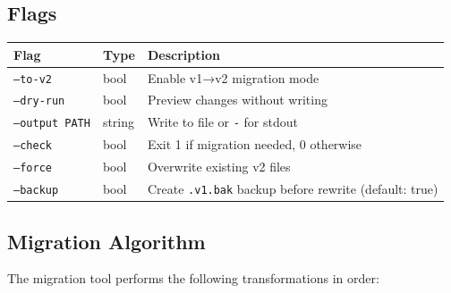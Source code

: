 \subsection{Flags}

\begin{center}
\begin{tabular}{llp{7cm}}
\textbf{Flag} & \textbf{Type} & \textbf{Description} \\
\hline
\texttt{--to-v2} & bool & Enable v1→v2 migration mode \\
\texttt{--dry-run} & bool & Preview changes without writing \\
\texttt{--output PATH} & string & Write to file or \texttt{-} for stdout \\
\texttt{--check} & bool & Exit 1 if migration needed, 0 otherwise \\
\texttt{--force} & bool & Overwrite existing v2 files \\
\texttt{--backup} & bool & Create \texttt{.v1.bak} backup before rewrite (default: true) \\
\end{tabular}
\end{center}

\subsection{Migration Algorithm}

The migration tool performs the following transformations in order:

